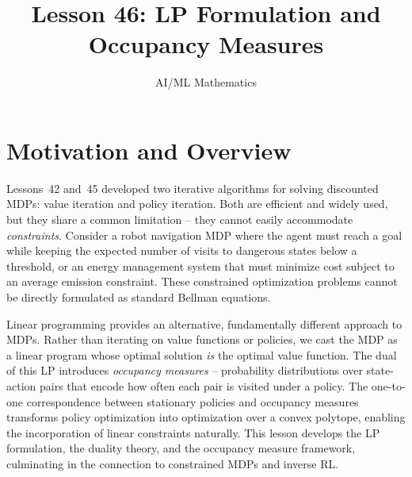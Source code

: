 \documentclass[11pt,a4paper]{article}
\title{Lesson 46: LP Formulation and Occupancy Measures}
\author{AI/ML Mathematics}
\date{}
\begin{document}
\maketitle
\tableofcontents
\newpage


\section{Motivation and Overview}
\label{sec:motivation}

Lessons~42 and~45 developed two iterative algorithms for solving
discounted MDPs: value iteration and policy iteration. Both are
efficient and widely used, but they share a common limitation --
they cannot easily accommodate \emph{constraints}. Consider a
robot navigation MDP where the agent must reach a goal while
keeping the expected number of visits to dangerous states below a
threshold, or an energy management system that must minimize cost
subject to an average emission constraint. These constrained
optimization problems cannot be directly formulated as standard
Bellman equations.

Linear programming provides an alternative, fundamentally different
approach to MDPs. Rather than iterating on value functions or
policies, we cast the MDP as a linear program whose optimal solution
\emph{is} the optimal value function. The dual of this LP introduces
\emph{occupancy measures} -- probability distributions over
state-action pairs that encode how often each pair is visited under
a policy. The one-to-one correspondence between stationary policies
and occupancy measures transforms policy optimization into
optimization over a convex polytope, enabling the incorporation of
linear constraints naturally. This lesson develops the LP formulation,
the duality theory, and the occupancy measure framework, culminating
in the connection to constrained MDPs and inverse RL.
\end{document}
